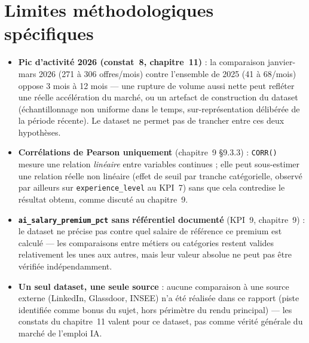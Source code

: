 \section{Limites méthodologiques spécifiques}

\begin{itemize}[leftmargin=1.5em]
  \item \textbf{Pic d'activité 2026 (constat~8, chapitre~11)} : la
    comparaison janvier-mars 2026 (271 à 306 offres/mois) contre
    l'ensemble de 2025 (41 à 68/mois) oppose 3 mois à 12 mois — une
    rupture de volume aussi nette peut refléter une réelle accélération
    du marché, ou un artefact de construction du dataset (échantillonnage
    non uniforme dans le temps, sur-représentation délibérée de la
    période récente). Le dataset ne permet pas de trancher entre ces
    deux hypothèses.
  \item \textbf{Corrélations de Pearson uniquement} (chapitre~9
    §9.3.3) : \texttt{CORR()} mesure une relation \emph{linéaire}
    entre variables continues ; elle peut sous-estimer une relation
    réelle non linéaire (effet de seuil par tranche catégorielle,
    observé par ailleurs sur \texttt{experience\_level} au KPI~7) sans
    que cela contredise le résultat obtenu, comme discuté au chapitre~9.
  \item \textbf{\texttt{ai\_salary\_premium\_pct} sans référentiel
    documenté} (KPI~9, chapitre~9) : le dataset ne précise pas contre
    quel salaire de référence ce premium est calculé — les
    comparaisons entre métiers ou catégories restent valides
    relativement les unes aux autres, mais leur valeur absolue ne peut
    pas être vérifiée indépendamment.
  \item \textbf{Un seul dataset, une seule source} : aucune comparaison
    à une source externe (LinkedIn, Glassdoor, INSEE) n'a été réalisée
    dans ce rapport (piste identifiée comme bonus du sujet,
    hors périmètre du rendu principal) — les constats du chapitre~11
    valent pour ce dataset, pas comme vérité générale du marché de
    l'emploi IA.
\end{itemize}
